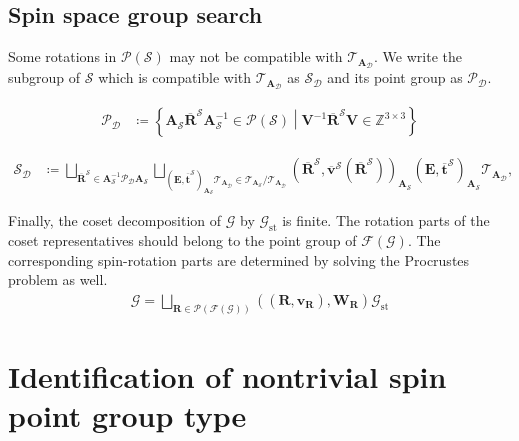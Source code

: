 \documentclass[a4paper, 11pt]{article}
\theoremstyle{definition}
\newcommand{\relmiddle}[1]{\mathrel{}\middle#1\mathrel{}}
\newcommand{\set}[2]{\left\{ #1 \relmiddle| #2 \right\}}
\begin{document}
\subsection{Spin space group search}

Some rotations in $\mathcal{P}(\mathcal{S})$ may not be compatible with $\mathcal{T}_{\bm{A}_{\mathcal{D}}}$.
We write the subgroup of $\mathcal{S}$ which is compatible with $\mathcal{T}_{\bm{A}_{\mathcal{D}}}$ as $\mathcal{S}_{\mathcal{D}}$ and its point group as $\mathcal{P}_{\mathcal{D}}$.

\begin{align}
  \mathcal{P}_{\mathcal{D}}
    &\coloneqq \set{
        \bm{A}_{\mathcal{S}} \overline{\bm{R}}^{\mathcal{S}} \bm{A}_{\mathcal{S}}^{-1} \in \mathcal{P}(\mathcal{S})
      }{
        \bm{V}^{-1} \overline{\bm{R}}^{\mathcal{S}} \bm{V} \in \mathbb{Z}^{3 \times 3}
      }
\end{align}

\begin{align}
  \mathcal{S}_{\mathcal{D}}
    &\coloneqq \bigsqcup_{
          \overline{\bm{R}}^{\mathcal{S}} \in \bm{A}_{\mathcal{S}}^{-1} \mathcal{P}_{\mathcal{D}} \bm{A}_{\mathcal{S}}
      } \bigsqcup_{
          \left( \bm{E}, \overline{ \bm{t} }^{\mathcal{S}} \right)_{ \bm{A}_{\mathcal{S}} } \mathcal{T}_{\bm{A}_{\mathcal{D}}}
          \in \mathcal{T}_{\bm{A}_{\mathcal{S}}} / \mathcal{T}_{\bm{A}_{\mathcal{D}}}
      }
      \left(
        \overline{\bm{R}}^{\mathcal{S}},
        \overline{ \bm{v} }^{\mathcal{S}}(\overline{\bm{R}}^{\mathcal{S}})
      \right)_{ \bm{A}_{\mathcal{S}} }
      \left( \bm{E}, \overline{ \bm{t} }^{\mathcal{S}} \right)_{ \bm{A}_{\mathcal{S}} }
      \mathcal{T}_{\bm{A}_{\mathcal{D}}},
\end{align}

Finally, the coset decomposition of $\mathcal{G}$ by $\mathcal{G}_{\mathrm{st}}$ is finite.
The rotation parts of the coset representatives should belong to the point group of $\mathcal{F}(\mathcal{G})$.
The corresponding spin-rotation parts are determined by solving the Procrustes problem as well.
\begin{align}
  \mathcal{G}
    = \bigsqcup_{ \bm{R} \in \mathcal{P}(\mathcal{F}(\mathcal{G})) } ((\bm{R}, \bm{v}_{\bm{R}}), \bm{W}_{\bm{R}}) \mathcal{G}_{\mathrm{st}}
\end{align}

\section{Identification of nontrivial spin point group type}
\end{document}
